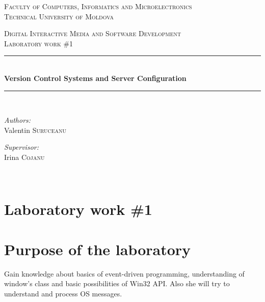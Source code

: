 \documentclass[12pt,a4paper,titlepage]{article}
\begin{document}
	
		\begin{center}
		
			\textsc{\large Faculty of Computers, Informatics and Microelectronics}\\[0.5cm]	
			\textsc{\large Technical University of Moldova}\\[1.2cm]
			\vspace{22mm}
			
			\textsc{\Large Digital Interactive Media and Software Development}\\[0.5cm]
			\textsc{\large Laboratory work \#1} \\[0.5cm]
			
			\newcommand{\KRule}{\rule{\linewidth}{0.5mm}}
			
			\vspace{10mm}
			\KRule \\[0.4cm]
			{\Large \bfseries Version Control Systems and Server Configuration }\\[0.4cm]
			\KRule \\[1.5cm]
			
			\vspace{30mm}
			\begin{minipage}{0.4\textwidth}
				\begin{flushleft}
					\emph{Authors:}\\
					Valentin \textsc{Suruceanu}
				\end{flushleft}
			\end{minipage}
			\begin{minipage}{0.4\textwidth}
				\begin{flushright}
					\emph{Supervisor:}\\
					Irina \textsc{Cojanu}
				\end{flushright}
			\end{minipage}\\[4cm]
			\vspace{5mm}
			\vfill							
		\end{center}
	
	\pagebreak
	\newpage
	 	\section*{Laboratory work \#1}
	 	
		\section{Purpose of the laboratory}
		Gain knowledge about basics of event-driven programming, understanding of window’s class and basic possibilities of Win32 API. Also she will try to understand and process OS messages.
\end{document}
